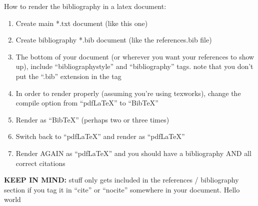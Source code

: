\documentclass[a4paper,12pt]{article} %
\begin{document}
How to render the bibliography in a latex document: 

\begin{enumerate}
\itemsep=-0.25em

\item Create main *.txt document (like this one)
\item Create bibliography *.bib document (like the references.bib file)
\item The bottom of your document (or wherever you want your references to show up), include ``bibliographystyle'' and ``bibliography'' tags. note that you don't put the ``.bib'' extension in the tag
\item In order to render properly (assuming you're using texworks), change the compile option from ``pdfLaTeX'' to ``BibTeX''
\item Render as ``BibTeX'' (perhaps two or three times)
\item Switch back to ``pdfLaTeX'' and render as ``pdfLaTeX''
\item Render AGAIN as ``pdfLaTeX'' and you should have a bibliography AND all correct citations
\end{enumerate}

\textbf{KEEP IN MIND:} stuff only gets included in the references / bibliography section if you tag it in ``cite'' or ``nocite'' somewhere in your document. Hello world \cite{redmon_you_2015}



\nocite{*} %




\end{document}
